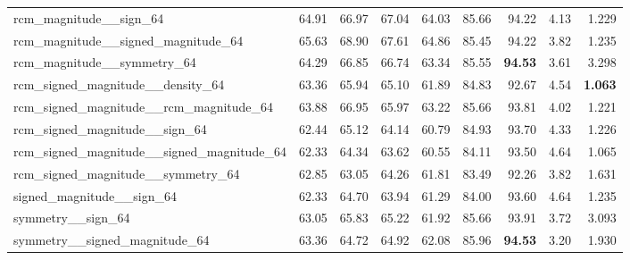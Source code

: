 \begin{table}[H]
{\begin{tabular}{lrrrrrrrr}
    rcm\_magnitude\_\_sign\_64                      & 64.91 & 66.97 & 67.04 & 64.03 & 85.66 & 94.22 & 4.13 & 1.229 \\
    rcm\_magnitude\_\_signed\_magnitude\_64         & 65.63 & 68.90 & 67.61 & 64.86 & 85.45 & 94.22 & 3.82 & 1.235 \\
    rcm\_magnitude\_\_symmetry\_64                  & 64.29 & 66.85 & 66.74 & 63.34 & 85.55 & \textbf{94.53} & 3.61 & 3.298 \\
    rcm\_signed\_magnitude\_\_density\_64           & 63.36 & 65.94 & 65.10 & 61.89 & 84.83 & 92.67 & 4.54 & \textbf{1.063} \\
    rcm\_signed\_magnitude\_\_rcm\_magnitude\_64    & 63.88 & 66.95 & 65.97 & 63.22 & 85.66 & 93.81 & 4.02 & 1.221 \\
    rcm\_signed\_magnitude\_\_sign\_64              & 62.44 & 65.12 & 64.14 & 60.79 & 84.93 & 93.70 & 4.33 & 1.226 \\
    rcm\_signed\_magnitude\_\_signed\_magnitude\_64 & 62.33 & 64.34 & 63.62 & 60.55 & 84.11 & 93.50 & 4.64 & 1.065 \\
    rcm\_signed\_magnitude\_\_symmetry\_64          & 62.85 & 63.05 & 64.26 & 61.81 & 83.49 & 92.26 & 3.82 & 1.631 \\
    signed\_magnitude\_\_sign\_64                   & 62.33 & 64.70 & 63.94 & 61.29 & 84.00 & 93.60 & 4.64 & 1.235 \\
    symmetry\_\_sign\_64                            & 63.05 & 65.83 & 65.22 & 61.92 & 85.66 & 93.91 & 3.72 & 3.093 \\
    symmetry\_\_signed\_magnitude\_64               & 63.36 & 64.72 & 64.92 & 62.08 & 85.96 & \textbf{94.53} & 3.20 & 1.930 \\
    \bottomrule
  \end{tabular}%
  }
\end{table}

